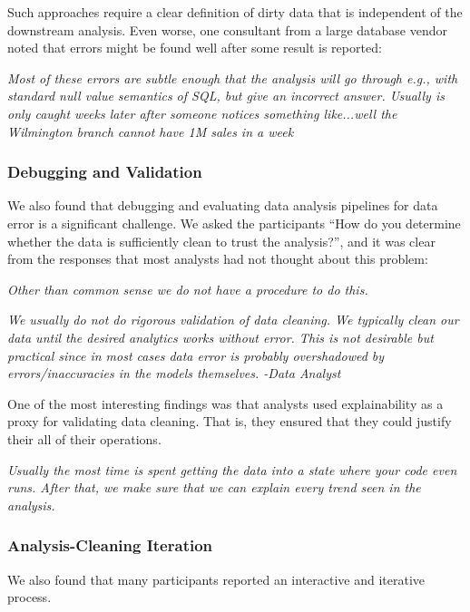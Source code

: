 \vspace{0.5em}

Such approaches require a clear definition of dirty data that is independent of the downstream analysis. Even worse, one consultant from a large database vendor noted that errors might be found well after some result is reported:

\vspace{0.5em}
\emph{Most of these errors are subtle enough that the analysis will go through e.g., with standard null value semantics of SQL, but give an incorrect answer. Usually is only caught weeks later after someone notices something like...well the Wilmington branch cannot have 1M sales in a week}

\subsubsection{Debugging and Validation}
We also found that debugging and evaluating data analysis pipelines for data error is a significant challenge. We asked the participants ``How do you determine whether the data is sufficiently clean to trust the analysis?'', and it was clear from the responses that most analysts had not thought about this problem:

\vspace{0.5em}
\emph{Other than common sense we do not have a procedure to do this.}

\vspace{0.5em}
\emph{We usually do not do rigorous validation of data cleaning. We typically clean our data until the desired analytics works without error. This is not desirable but practical since in most cases data error is probably overshadowed by errors/inaccuracies in the models themselves. -Data Analyst}

\vspace{0.5em}

One of the most interesting findings was that analysts used explainability as a proxy for validating data cleaning. That is, they ensured that they could justify their all of their operations.

\vspace{0.5em}
\emph{Usually the most time is spent getting the data into a state where your code even runs. After that, we make sure that we can explain every trend seen in the analysis.}

\subsubsection{Analysis-Cleaning Iteration}
We also found that many participants reported an interactive and iterative process.

